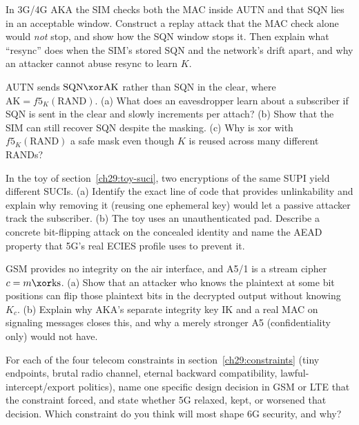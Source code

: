 \begin{exercise}
In 3G/4G AKA the SIM checks both the MAC inside AUTN and that SQN lies in an acceptable window. Construct a replay attack that the MAC check alone would \emph{not} stop, and show how the SQN window stops it. Then explain what ``resync'' does when the SIM's stored SQN and the network's drift apart, and why an attacker cannot abuse resync to learn $K$.
\end{exercise}

\begin{exercise}
AUTN sends $\text{SQN}\xor\text{AK}$ rather than SQN in the clear, where $\text{AK}=f5_K(\text{RAND})$. (a) What does an eavesdropper learn about a subscriber if SQN is sent in the clear and slowly increments per attach? (b) Show that the SIM can still recover SQN despite the masking. (c) Why is xor with $f5_K(\text{RAND})$ a safe mask even though $K$ is reused across many different RANDs?
\end{exercise}

\begin{exercise}
In the toy of section~\ref{ch29:toy-suci}, two encryptions of the same SUPI yield different SUCIs. (a) Identify the exact line of code that provides unlinkability and explain why removing it (reusing one ephemeral key) would let a passive attacker track the subscriber. (b) The toy uses an unauthenticated pad. Describe a concrete bit-flipping attack on the concealed identity and name the AEAD property that 5G's real ECIES profile uses to prevent it.
\end{exercise}

\begin{exercise}
GSM provides no integrity on the air interface, and A5/1 is a stream cipher $c = m \xor \text{ks}$. (a) Show that an attacker who knows the plaintext at some bit positions can flip those plaintext bits in the decrypted output without knowing $K_c$. (b) Explain why AKA's separate integrity key IK and a real MAC on signaling messages closes this, and why a merely stronger A5 (confidentiality only) would not have.
\end{exercise}

\begin{exercise}
For each of the four telecom constraints in section~\ref{ch29:constraints} (tiny endpoints, brutal radio channel, eternal backward compatibility, lawful-intercept/export politics), name one specific design decision in GSM or LTE that the constraint forced, and state whether 5G relaxed, kept, or worsened that decision. Which constraint do you think will most shape 6G security, and why?
\end{exercise}
